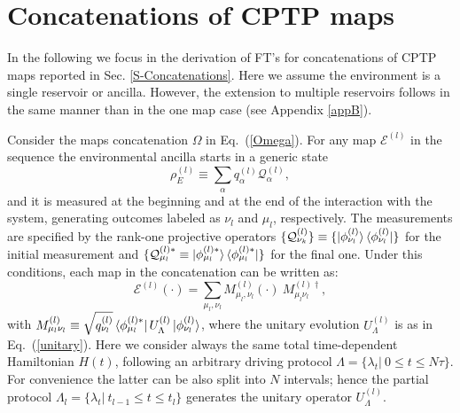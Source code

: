 \documentclass[aps,prx,twocolumn,showpacs,floatfix,superscriptaddress,graphics,longbibliography]{revtex4-1}
\newcommand{\E}{{\mathcal E}}
\newcommand{\HAT}{}
\begin{document}
\section{Concatenations of CPTP maps} \label{appC}

In the following we focus in the derivation of FT's for concatenations of CPTP maps reported in Sec. \ref{S-Concatenations}. Here we assume the environment is a single reservoir or ancilla. 
However, the extension to multiple reservoirs follows in the same manner than in the one map case (see Appendix \ref{appB}).

Consider the maps concatenation $\Omega$ in Eq.~(\ref{Omega}). For any map $\E^{(l)}$ in the sequence the environmental ancilla starts in a generic state
\begin{equation}\label{rhoEcon}
 \rho_E^{(l)} \equiv \sum_{\alpha} q_{\alpha}^{(l)} \HAT{\mathcal{Q}}_{\alpha}^{(l)},
\end{equation} 
and it is measured at the beginning and at the end of the interaction with the system, generating outcomes labeled as $\nu_l$ and $\mu_l$, respectively. 
The measurements are specified by the rank-one projective 
operators $\{ \HAT{\mathcal{Q}}_{\nu_k}^{(l)}\} \equiv \{ \ket{\phi_{\nu_l}^{(l)}} \bra{\phi_{\nu_l}^{(l)}}\}$ for the initial measurement 
and $\{\HAT{\mathcal{Q}}_{\mu_l}^{(l) \ast} \equiv \ket{\phi_{\mu_l}^{(l) \ast}} \bra{\phi_{\mu_l}^{(l) \ast}} \}$ for the final one. 
Under this conditions, each map in the concatenation can be written as: 
\begin{equation} \label{k_op_c}
 \E^{(l)}(\cdot) = \sum_{\mu_l, \nu_l} M_{\mu_l, \nu_l}^{(l)} (\cdot )~ M_{\mu_l \nu_l}^{(l) \dagger},
\end{equation}
with $M_{\mu_l \nu_l}^{(l)} \equiv \sqrt{q_{\nu_l}^{(l)}} \bra{\phi_{\mu_l}^{(l) \ast}} \HAT{U}_\Lambda^{(l)} \ket{\phi_{\nu_l}^{(l)}}$, 
where the unitary evolution $\HAT{U}_\Lambda^{(l)}$ is as in Eq.~(\ref{unitary}). 
Here we consider always the same total time-dependent Hamiltonian $\HAT{H}(t)$, following an arbitrary driving protocol $\Lambda = \{\lambda_t |~ 0 \leq t \leq N\tau \}$. 
For convenience the latter can be also split into $N$ intervals; hence the partial protocol $\Lambda_l = \{ \lambda_t |~ t_{l-1} \leq t \leq t_l \}$ generates the unitary 
operator $\HAT{U}_\Lambda^{(l)}$.
\end{document}
